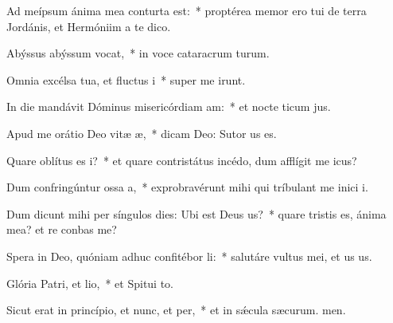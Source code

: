 \item Ad meípsum ánima mea conturta est:~* proptérea memor ero tui de terra Jordánis, et Hermóniim a te dico.
\item Abýssus abýssum vocat,~* in voce cataracrum turum.
\item Omnia excélsa tua, et fluctus i~* super me irunt.
\item In die mandávit Dóminus misericórdiam am:~* et nocte ticum jus.
\item Apud me orátio Deo vitæ æ,~* dicam Deo: Sutor us es.
\item Quare oblítus es i?~* et quare contristátus incédo, dum afflígit me icus?
\item Dum confringúntur ossa a,~* exprobravérunt mihi qui tríbulant me inici i.
\item Dum dicunt mihi per síngulos dies: Ubi est Deus us?~* quare tristis es, ánima mea? et re conbas me?
\item Spera in Deo, quóniam adhuc confitébor li:~* salutáre vultus mei, et us us.
\item Glória Patri, et lio,~* et Spitui to.
\item Sicut erat in princípio, et nunc, et per,~* et in sǽcula sæcurum. men.
